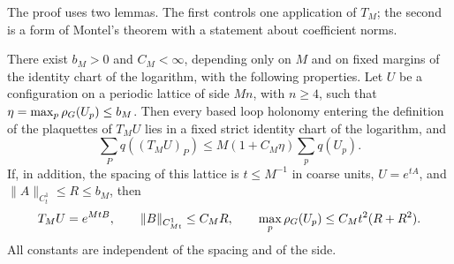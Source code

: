 The proof uses two lemmas. The first controls one application of $T_M$; the second is a form of Montel's theorem with a statement about coefficient norms.

\begin{lemma}\label{ch08:lem:one-step}
There exist $b_M>0$ and $C_M<\infty$, depending only on $M$ and on fixed margins of the identity chart of the logarithm, with the following properties. Let $U$ be a configuration on a periodic lattice of side $Mn$, with $n\ge4$, such that $\eta=\max_p\rho_G(U_p)\le b_M$. Then every based loop holonomy entering the definition of the plaquettes of $T_MU$ lies in a fixed strict identity chart of the logarithm, and
\begin{equation}\label{ch08:eq:one-step-energy}
 \sum_Pq((T_MU)_P)\le M(1+C_M\eta)\sum_pq(U_p).
\end{equation}
If, in addition, the spacing of this lattice is $t\le M^{-1}$ in coarse units, $U=e^{tA}$, and $\|A\|_{C^1_t}\le R\le b_M$, then
\begin{equation}\label{ch08:eq:one-step-potential}
 T_MU=e^{MtB},\qquad
 \|B\|_{C^1_{Mt}}\le C_MR,\qquad
 \max_p\rho_G(U_p)\le C_Mt^2(R+R^2).
\end{equation}
All constants are independent of the spacing and of the side.
\end{lemma}


